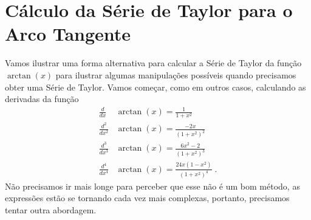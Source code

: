 \section{Cálculo da Série de Taylor para o Arco Tangente}

Vamos ilustrar uma forma alternativa para calcular a Série de Taylor da
função $\arctan(x)$ para ilustrar algumas manipulações possíveis
quando precisamos obter uma Série de Taylor.
Vamos começar, como em outros casos, calculando as derivadas da função
\begin{align*}
  \frac{d}{dx}     & \arctan(x) = \frac{1}{1+x^2}                     \\[3mm]
  \frac{d^2}{dx^2} & \arctan(x) = \frac{-2x}{(1+x^2)^2}               \\[3mm]
  \frac{d^3}{dx^3} & \arctan(x) = \frac{6x^2-2}{(1+x^2)^3}            \\[3mm]
  \frac{d^4}{dx^4} & \arctan(x) = \frac{24x(1-x^2)}{(1+x^2)^4}   \;.
\end{align*}
Não precisamos ir mais longe para perceber que esse não é um bom método,
as expressões estão se tornando cada vez mais complexas,
portanto, precisamos tentar outra abordagem.

